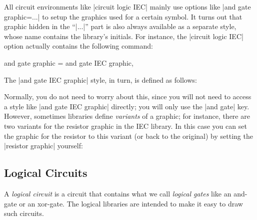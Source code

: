 All circuit environments like |circuit logic IEC| mainly use options
like |and gate graphic=...| to setup the graphics used for a certain
symbol. It turns out that graphic hidden in the ``|...|'' part is also
always available as a separate style, whose name contains the
library's initials. For instance, the |circuit logic IEC| option
actually contains the following command:
\begin{codeexample}
  and gate graphic = and gate IEC graphic,
\end{codeexample}
The |and gate IEC graphic| style, in turn, is defined as follows:
\begin{codeexample}
\end{codeexample}

Normally, you do not need to worry about this, since you will not need
to access a style like |and gate IEC graphic| directly; you will only
use the |and gate| key. However, sometimes libraries define
\emph{variants} of a graphic; for instance, there are two variants for
the resistor graphic in the IEC library. In this case you can set the
graphic for the resistor to this variant (or back to the original) by
setting the |resistor graphic| yourself:

\begin{codeexample}[]
\end{codeexample}



\subsection{Logical Circuits}

A \emph{logical circuit} is a circuit that contains what we call
\emph{logical gates} like an and-gate or an xor-gate. The logical
libraries are intended to make it easy to draw such circuits.

